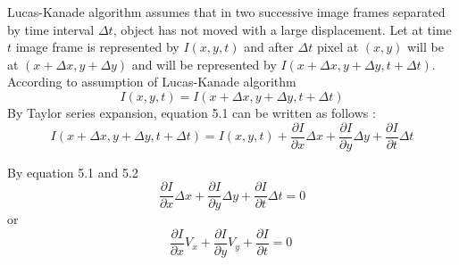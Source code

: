 

Lucas-Kanade algorithm assumes that in two successive image frames separated by time interval \(\Delta t\), object has not moved with a large displacement. Let at time \(t\) image frame is represented by \(I(x,y,t)\) and after \(\Delta t\) pixel at \((x,y)\) will be at \((x+\Delta x, y+\Delta y)\) and will be represented by \(I(x+\Delta x, y+\Delta y, t+\Delta t)\). According to assumption of Lucas-Kanade algorithm 
\begin{equation}
    I(x,y,t) = I(x+\Delta x, y+\Delta y, t+\Delta t)
\end{equation}
By Taylor series expansion, equation 5.1 can be written as follows : 
\begin{equation}
    I(x+\Delta x,y+\Delta y,t+\Delta t) = I(x,y,t) + \frac{\partial I}{\partial x}\Delta x+\frac{\partial I}{\partial y}\Delta y+\frac{\partial I}{\partial t}\Delta t
\end{equation}

By equation 5.1 and 5.2 
    \[\frac{\partial I}{\partial x}\Delta x+\frac{\partial I}{\partial y}\Delta y+\frac{\partial I}{\partial t}\Delta t = 0\]
    or 
    \begin{equation}
        \frac{\partial I}{\partial x}V_x+\frac{\partial I}{\partial y}V_y+\frac{\partial I}{\partial t} = 0\
    \end{equation}
    
